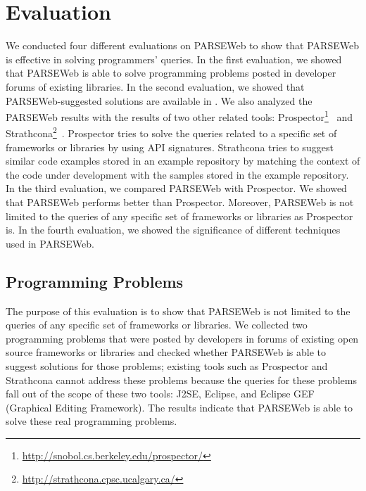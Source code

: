 \section{Evaluation}
\label{sec:evaluation}

We conducted four different evaluations on PARSEWeb to show that
PARSEWeb is effective in solving programmers' queries. In the
first evaluation, we showed that PARSEWeb is able to solve
programming problems posted in developer forums of existing
libraries. In the second evaluation, we showed that
PARSEWeb-suggested solutions are available in \realprojects{}. We
also analyzed the PARSEWeb results with the results of two other
related tools:
Prospector\footnote{\url{http://snobol.cs.berkeley.edu/prospector/}}~\cite{prospector:jungloid}
and
Strathcona\footnote{\url{http://strathcona.cpsc.ucalgary.ca/}}~\cite{strathcona:se}.
Prospector tries to solve the queries related to a specific set of
frameworks or libraries by using API signatures. Strathcona tries to
suggest similar code examples stored in an example repository by
matching the context of the code under development with the samples
stored in the example repository. In the third evaluation, we
compared PARSEWeb with Prospector. We showed that PARSEWeb performs
better than Prospector. Moreover, PARSEWeb is not limited to the
queries of any specific set of frameworks or libraries as Prospector
is. In the fourth evaluation, we showed the significance of different techniques used
in PARSEWeb.

\subsection{Programming Problems}
\label{sec:subexperiments}

The purpose of this evaluation is to show that PARSEWeb is not
limited to the queries of any specific set of frameworks or
libraries. We collected two programming problems that were posted
by developers in forums of existing open source frameworks or
libraries and checked whether PARSEWeb is able to suggest solutions
for those problems; existing tools such as Prospector and Strathcona
cannot address these problems because the queries for these problems
fall out of the scope of these two tools: J2SE, Eclipse, and Eclipse
GEF (Graphical Editing Framework). The results indicate that PARSEWeb is able to solve
these real programming problems.

